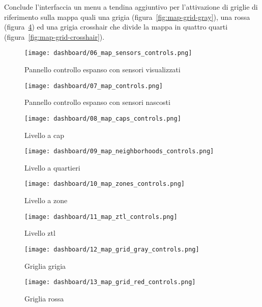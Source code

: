 Conclude l'interfaccia un menu a tendina aggiuntivo per l'attivazione di griglie di riferimento sulla mappa
quali una grigia (figura~\ref{fig:map-grid-gray}), una rossa
(figura~\ref{fig:map-grid-red}) ed una grigia crosshair che divide la mappa
in quattro quarti (figura~\ref{fig:map-grid-crosshair}).

\begin{figure}[H]
  \centering
  \texttt{[image: dashboard/06\_map\_sensors\_controls.png]}
  \caption{Pannello controllo espanso con sensori visualizzati}
  \label{fig:map-layer-sensors}

  \hfill

  \texttt{[image: dashboard/07\_map\_controls.png]}
  \caption{Pannello controllo espanso con sensori nascosti}
  \label{fig:map-layer-clear}
\end{figure}

\newpage

\begin{figure}[H]
  \centering
  \texttt{[image: dashboard/08\_map\_caps\_controls.png]}
  \caption{Livello a \acrshort{cap}}
  \label{fig:map-layer-caps}

  \hfill

  \texttt{[image: dashboard/09\_map\_neighborhoods\_controls.png]}
  \caption{Livello a quartieri}
  \label{fig:map-layer-neighborhoods}
\end{figure}

\begin{figure}[H]
  \centering
  \texttt{[image: dashboard/10\_map\_zones\_controls.png]}
  \caption{Livello a zone}
  \label{fig:map-layer-zones}

  \hfill

  \texttt{[image: dashboard/11\_map\_ztl\_controls.png]}
  \caption{Livello \acrshort{ztl}}
  \label{fig:map-layer-ztl}
\end{figure}

\newpage

\begin{figure}[H]
  \centering

  \texttt{[image: dashboard/12\_map\_grid\_gray\_controls.png]}
  \caption{Griglia grigia}
  \label{fig:map-grid-gray}

  \hfill

  \centering
  \texttt{[image: dashboard/13\_map\_grid\_red\_controls.png]}
  \caption{Griglia rossa}
  \label{fig:map-grid-red}
\end{figure}

